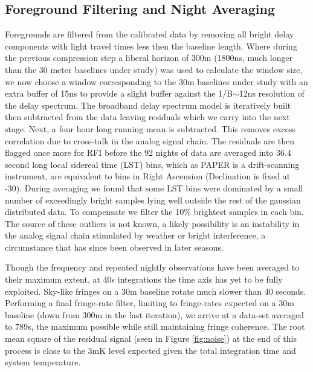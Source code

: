 \documentclass[preprint]{aastex}
\begin{document}
\subsection{Foreground Filtering and Night Averaging}
Foregrounds are filtered from the calibrated data by removing all bright delay components with light travel times less then the baseline length. Where during the previous compression step a liberal horizon of 300m (1800ns, much longer than the 30 meter baselines under study)  was used to calculate the window size, we now choose a window corresponding to the 30m baselines under study with an extra buffer of 15ns to provide a slight buffer against the 1/B$\sim$12ns resolution of the delay spectrum.  The broadband delay spectrum model is iteratively built then subtracted from the data leaving residuals which we carry into the next stage. Next, a four hour long running mean is subtracted. This removes excess correlation due to cross-talk in the analog signal chain. The residuals are then flagged once more for RFI before the 92 nights of data are averaged into 36.4 second long local sidereal time (LST) bins, which as PAPER is a drift-scanning instrument, are equivalent to bins in Right Ascension (Declination is fixed at -30\arcdeg).  During averaging we found that some LST bins were dominated by a small number of exceedingly bright samples lying well outside the rest of the gaussian distributed data. To compensate we filter the 10\% brightest samples in each bin.  The source of these outliers is not known,  a likely possibility is an instability in the analog signal chain stimulated by weather or bright interference, a circumstance that has since been observed in later seasons. 


Though the frequency and repeated nightly observations have been averaged to their maximum extent, at 40s integrations the time axis has yet to be fully exploited.  Sky-like fringes on a 30m baseline rotate much slower than 40 seconds.  Performing a final fringe-rate filter, limiting to fringe-rates expected on a 30m baseline (down from 300m in the last iteration), we arrive at a data-set averaged to 789s, the maximum possible while still maintaining fringe coherence.    The root mean square of the residual signal (seen in Figure \ref{fig:noise}) at the end of this process is close to the 3mK level expected given the total integration time and  system temperature.  

\end{document}
